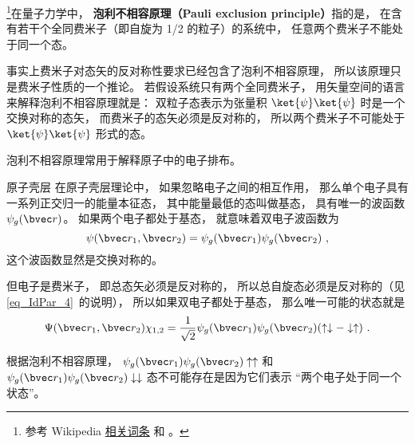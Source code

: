 
\begin{issues}
\issueDraft
\end{issues}

\footnote{参考 Wikipedia \href{https://en.wikipedia.org/wiki/Pauli_exclusion_principle}{相关词条} 和 \cite{GriffQ}。}在量子力学中， \textbf{泡利不相容原理（Pauli exclusion principle）}指的是， 在含有若干个全同费米子（即自旋为 1/2 的粒子）的系统中， 任意两个费米子不能处于同一个态。

事实上费米子对态矢的反对称性要求已经包含了泡利不相容原理， 所以该原理只是费米子性质的一个推论。 若假设系统只有两个全同费米子， 用矢量空间的语言来解释泡利不相容原理就是： 双粒子态表示为张量积 $\ket{\psi}\ket{\psi}$ 时是一个交换对称的态矢， 而费米子的态矢必须是反对称的， 所以两个费米子不可能处于 $\ket{\psi}\ket{\psi}$ 形式的态。

泡利不相容原理常用于解释原子中的电子排布。

\begin{example}{原子壳层}
在原子壳层理论中， 如果忽略电子之间的相互作用， 那么单个电子具有一系列正交归一的能量本征态， 其中能量最低的态叫做基态， 具有唯一的波函数 $\psi_g(\bvec r)$。 如果两个电子都处于基态， 就意味着双电子波函数为
\begin{equation}
\psi(\bvec r_1, \bvec r_2) = \psi_g(\bvec r_1)\psi_g(\bvec r_2)~,
\end{equation}
这个波函数显然是交换对称的。

但电子是费米子， 即总态矢必须是反对称的， 所以总自旋态必须是反对称的（见\autoref{eq_IdPar_4}~的说明）， 所以如果双电子都处于基态， 那么唯一可能的状态就是
\begin{equation}
\Psi(\bvec r_1, \bvec r_2) \chi_{1,2} = \frac{1}{\sqrt{2}}\psi_g(\bvec r_1)\psi_g(\bvec r_2)(\uparrow\downarrow - \downarrow\uparrow)~.
\end{equation}

根据泡利不相容原理， $\psi_g(\bvec r_1)\psi_g(\bvec r_2)\uparrow\uparrow$ 和 $\psi_g(\bvec r_1)\psi_g(\bvec r_2)\downarrow\downarrow$ 态不可能存在是因为它们表示 “两个电子处于同一个状态”。
\end{example}
